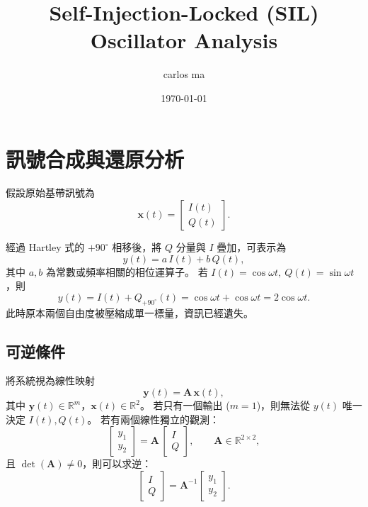 \documentclass{article}
\title{Self-Injection-Locked (SIL) Oscillator Analysis}
\author{carlos ma}
\date{\today}
\begin{document}
\maketitle
\section*{訊號合成與還原分析}

假設原始基帶訊號為
\[
\mathbf{x}(t)=
\begin{bmatrix}
I(t)\\[4pt]
Q(t)
\end{bmatrix}.
\]

經過 Hartley 式的 $+90^{\circ}$ 相移後，將 $Q$ 分量與 $I$ 疊加，可表示為
\[
y(t)=a\,I(t)+b\,Q(t),
\]
其中 $a,b$ 為常數或頻率相關的相位運算子。  
若 $I(t)=\cos\omega t,\ Q(t)=\sin\omega t$，則
\[
y(t)=I(t)+Q_{+\!90^{\circ}}(t)
= \cos\omega t + \cos\omega t
= 2\cos\omega t.
\]
此時原本兩個自由度被壓縮成單一標量，資訊已經遺失。

\subsection*{可逆條件}
將系統視為線性映射
\[
\mathbf{y}(t)=\mathbf{A}\,\mathbf{x}(t),
\]
其中 $\mathbf{y}(t)\in\mathbb{R}^{m}$，$\mathbf{x}(t)\in\mathbb{R}^{2}$。  
若只有一個輸出 ($m=1$)，則無法從 $y(t)$ 唯一決定 $I(t),Q(t)$。  
若有兩個線性獨立的觀測：
\[
\begin{bmatrix}y_1\\y_2\end{bmatrix}
=\mathbf{A}\,
\begin{bmatrix}I\\Q\end{bmatrix},
\qquad
\mathbf{A}\in\mathbb{R}^{2\times 2},
\]
且 $\det(\mathbf{A})\neq 0$，則可以求逆：
\[
\begin{bmatrix}I\\Q\end{bmatrix}
=\mathbf{A}^{-1}
\begin{bmatrix}y_1\\y_2\end{bmatrix}.
\]
\end{document}
